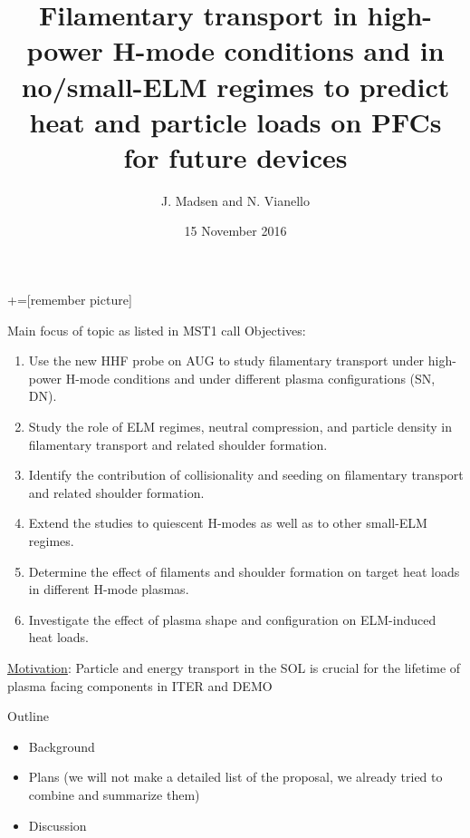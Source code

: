 \documentclass[10pt, compress]{beamer}
\title{Filamentary transport in high-power H-mode conditions and in
  no/small-ELM regimes to predict heat and particle loads on PFCs for
  future devices}
\date{15 November 2016}
\author[Topic 21. J. Madsen and N.Vianello]{J. Madsen and N. Vianello}
\begin{document}
+=[remember picture]
\maketitle

\begin{frame}{Main focus of topic as listed in MST1 call}
\vspace{-1cm}
Objectives:
\begin{enumerate}
\item Use the new HHF probe on AUG to study filamentary transport under
high-power H-mode conditions and under different plasma configurations (SN,
DN).
\item Study the role of ELM regimes, neutral compression, and particle density in
filamentary transport and related shoulder formation.
\item Identify the contribution of collisionality and seeding on filamentary transport
and related shoulder formation.
\item Extend the studies to quiescent H-modes as well as to other small-ELM regimes.
\item Determine the effect of filaments and shoulder formation on target heat loads
in different H-mode plasmas.
\item Investigate the effect of plasma shape and configuration on ELM-induced heat
loads.
\end{enumerate}
\underline{Motivation}: Particle and energy transport in the SOL is crucial for the lifetime of plasma facing components in ITER and DEMO
\end{frame}

\begin{frame}{Outline}
	\begin{itemize}
		\item Background 
		\item Plans (we will not make a detailed list of the
                  proposal, we already tried to combine and summarize them)
		\item Discussion
	\end{itemize}	
\end{frame}
\end{document}
